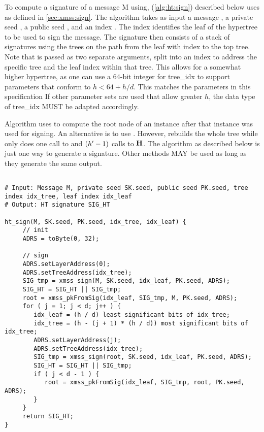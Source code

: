    To compute a \hyper signature \htsig of a message M using, \htsign 
   (\autoref{alg:ht:sign}) described below
   uses \xmsssign as defined in \autoref{sec:xmss:sign}.  
   The algorithm \htsign takes as input a message \msg, a private seed \sseed, 
   a public seed \pseed, and an index \idx. The index identifies the leaf
   of the hypertree to be used to sign the message. The \hyper signature then 
   consists of a stack of \xmss signatures using the \xmss trees on the path
   from the leaf with index \idx  to the top tree. Note that \idx is passed as two
   separate arguments, split into an index to address the specific tree and the
   leaf index within that tree. This allows for a somewhat higher hypertree,
   as one can use a 64-bit integer for tree\_idx to support parameters that
   conform to $h < 64 + h / d$. This matches the parameters in this specification
   If other parameter sets are used that allow greater $h$,
   the data type of tree\_idx MUST be adapted accordingly.
   
   Algorithm \htsign uses \xmsspkfromsig to compute the root node of an 
   \xmss instance after that instance was used for signing. An alternative is 
   to use \xmsspkgen. However, \xmsspkgen rebuilds the whole tree while 
   \xmsspkfromsig only does one call to \wotspkfromsig and $({h'}-1)$ calls 
   to $\mathbf{H}$. The algorithm \htsign as described below is just one way 
   to generate a \hyper signature. Other methods MAY be used as long as they 
   generate the same output.

\begin{lstlisting}[label=alg:ht:sign, breaklines=true, mathescape, language=pseudoc,
                   caption=\htsign\ -- Generating an \hyper signature]
   
# Input: Message M, private seed SK.seed, public seed PK.seed, tree index idx_tree, leaf index idx_leaf
# Output: HT signature SIG_HT

ht_sign(M, SK.seed, PK.seed, idx_tree, idx_leaf) {
     // init
     ADRS = toByte(0, 32);
     
     // sign
     ADRS.setLayerAddress(0);
     ADRS.setTreeAddress(idx_tree);
     SIG_tmp = xmss_sign(M, SK.seed, idx_leaf, PK.seed, ADRS);
     SIG_HT = SIG_HT || SIG_tmp;
     root = xmss_pkFromSig(idx_leaf, SIG_tmp, M, PK.seed, ADRS);
     for ( j = 1; j < d; j++ ) {
        idx_leaf = (h / d) least significant bits of idx_tree;
        idx_tree = (h - (j + 1) * (h / d)) most significant bits of idx_tree;
        ADRS.setLayerAddress(j);
        ADRS.setTreeAddress(idx_tree);
        SIG_tmp = xmss_sign(root, SK.seed, idx_leaf, PK.seed, ADRS);
        SIG_HT = SIG_HT || SIG_tmp;
        if ( j < d - 1 ) {
           root = xmss_pkFromSig(idx_leaf, SIG_tmp, root, PK.seed, ADRS);
        }
     }
     return SIG_HT;
}
\end{lstlisting}

